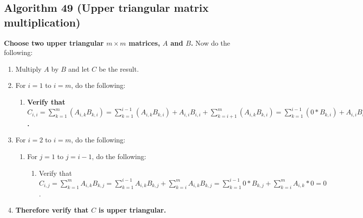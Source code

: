 \documentclass[twocolumn]{article}
\begin{document}
		\subsection{Algorithm 49 (Upper triangular matrix multiplication)}\label{sec:algorithm 49}
			\textbf{Choose two upper triangular $m\times m$ matrices, $A$ and $B$.} Now do the following:
			\begin{enumerate}
				\item Multiply $A$ by $B$ and let $C$ be the result.
				\item For $i=1$ to $i=m$, do the following:
				\begin{enumerate}
					\item \textbf{Verify that $C_{i,i}=\sum_{k=1}^m (A_{i,k}B_{k,i})=\sum_{k=1}^{i-1} (A_{i,k}B_{k,i})+A_{i,i}B_{i,i}+\sum_{k=i+1}^m (A_{i,k}B_{k,i})=\sum_{k=1}^{i-1} (0*B_{k,i})+A_{i,i}B_{i,i}+\sum_{k=i+1}^m (A_{i,k}*0)=A_{i,i}B_{i,i}$.}
				\end{enumerate}
				\item For $i=2$ to $i=m$, do the following:
				\begin{enumerate}
					\item For $j=1$ to $j=i-1$, do the following:
					\begin{enumerate}
						\item Verify that $C_{i,j}=\sum_{k=1}^m A_{i,k}B_{k,j}=\sum_{k=1}^{i-1} A_{i,k}B_{k,j}+\sum_{k=i}^m A_{i,k}B_{k,j}=\sum_{k=1}^{i-1} 0*B_{k,j}+\sum_{k=i}^m A_{i,k}*0=0$.
					\end{enumerate}
				\end{enumerate}
				\item \textbf{Therefore verify that $C$ is upper triangular.}
			\end{enumerate}
\end{document}
